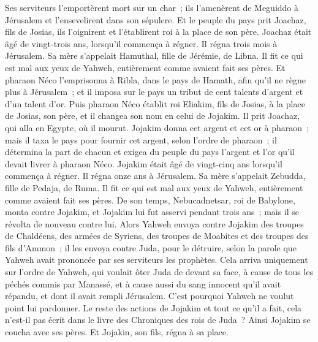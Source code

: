\begin{multicols}{2}
Ses serviteurs l'emportèrent mort sur un char~; ils l'amenèrent de Meguiddo à Jérusalem et l'ensevelirent dans son sépulcre. Et le peuple du pays prit Joachaz, fils de Josias, ils l'oignirent et l'établirent roi à la place de son père.
Joachaz était âgé de vingt-trois ans, lorsqu'il commença à régner. Il régna trois mois à Jérusalem. Sa mère s'appelait Hamuthal, fille de Jérémie, de Libna.
Il fit ce qui est mal aux yeux de Yahweh, entièrement comme avaient fait ses pères.
Et pharaon Néco l'emprisonna à Ribla, dans le pays de Hamath, afin qu'il ne règne plus à Jérusalem~; et il imposa sur le pays un tribut de cent talents d'argent et d'un talent d'or.
Puis pharaon Néco établit roi Eliakim, fils de Josias, à la place de Josias, son père, et il changea son nom en celui de Jojakim. Il prit Joachaz, qui alla en Egypte, où il mourut.
Jojakim donna cet argent et cet or à pharaon~; mais il taxa le pays pour fournir cet argent, selon l'ordre de pharaon~; il détermina la part de chacun et exigea du peuple du pays l'argent et l'or qu'il devait livrer à pharaon Néco.
Jojakim était âgé de vingt-cinq ans lorsqu'il commença à régner. Il régna onze ans à Jérusalem. Sa mère s'appelait Zebudda, fille de Pedaja, de Ruma.
Il fit ce qui est mal aux yeux de Yahweh, entièrement comme avaient fait ses pères.
\VerseOne{}De son temps, Nebucadnetsar, roi de Babylone, monta contre Jojakim, et Jojakim lui fut asservi pendant trois ans~; mais il se révolta de nouveau contre lui.
Alors Yahweh envoya contre Jojakim des troupes de Chaldéens, des armées de Syriens, des troupes de Moabites et des troupes des fils d'Ammon~; il les envoya contre Juda, pour le détruire, selon la parole que Yahweh avait prononcée par ses serviteurs les prophètes.
Cela arriva uniquement sur l'ordre de Yahweh, qui voulait ôter Juda de devant sa face, à cause de tous les péchés commis par Manassé,
et à cause aussi du sang innocent qu'il avait répandu, et dont il avait rempli Jérusalem. C'est pourquoi Yahweh ne voulut point lui pardonner.
Le reste des actions de Jojakim et tout ce qu'il a fait, cela n'est-il pas écrit dans le livre des Chroniques des rois de Juda~?
Ainsi Jojakim se coucha avec ses pères. Et Jojakin, son fils, régna à sa place.

\end{multicols}
